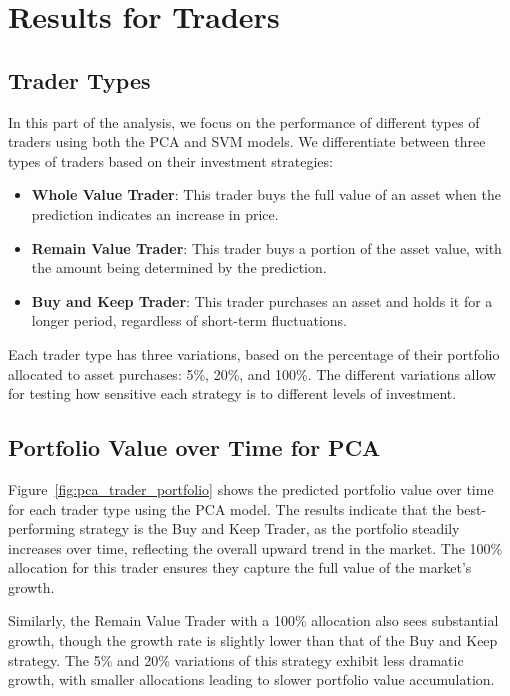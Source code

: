 \documentclass[journal]{IEEEtran}
\begin{document}
\section{Results for Traders}

\subsection{Trader Types}

In this part of the analysis, we focus on the performance of different types of traders using both the PCA and SVM models. We differentiate between three types of traders based on their investment strategies: 
\begin{itemize}
    \item \textbf{Whole Value Trader}: This trader buys the full value of an asset when the prediction indicates an increase in price.
    \item \textbf{Remain Value Trader}: This trader buys a portion of the asset value, with the amount being determined by the prediction. 
    \item \textbf{Buy and Keep Trader}: This trader purchases an asset and holds it for a longer period, regardless of short-term fluctuations.
\end{itemize}

Each trader type has three variations, based on the percentage of their portfolio allocated to asset purchases: 5\%, 20\%, and 100\%. The different variations allow for testing how sensitive each strategy is to different levels of investment.

\subsection{Portfolio Value over Time for PCA}

Figure~\ref{fig:pca_trader_portfolio} shows the predicted portfolio value over time for each trader type using the PCA model. The results indicate that the best-performing strategy is the Buy and Keep Trader, as the portfolio steadily increases over time, reflecting the overall upward trend in the market. The 100\% allocation for this trader ensures they capture the full value of the market’s growth.

Similarly, the Remain Value Trader with a 100\% allocation also sees substantial growth, though the growth rate is slightly lower than that of the Buy and Keep strategy. The 5\% and 20\% variations of this strategy exhibit less dramatic growth, with smaller allocations leading to slower portfolio value accumulation.
\end{document}
